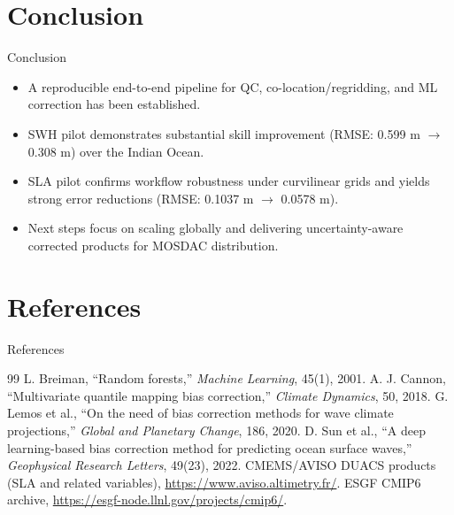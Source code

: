 \documentclass[aspectratio=169,11pt]{beamer}
\begin{document}
\section{Conclusion}

\begin{frame}{Conclusion}
  \begin{itemize}
    \item A reproducible end-to-end pipeline for QC, co-location/regridding, and ML correction has been established.
    \item SWH pilot demonstrates substantial skill improvement (RMSE: 0.599 m $\rightarrow$ 0.308 m) over the Indian Ocean.
    \item SLA pilot confirms workflow robustness under curvilinear grids and yields strong error reductions (RMSE: 0.1037 m $\rightarrow$ 0.0578 m).
    \item Next steps focus on scaling globally and delivering uncertainty-aware corrected products for MOSDAC distribution.
  \end{itemize}
\end{frame}

\section{References}

\begin{frame}[allowframebreaks]{References}
  \footnotesize
  \begin{thebibliography}{99}
     L. Breiman, ``Random forests,'' \emph{Machine Learning}, 45(1), 2001.
     A. J. Cannon, ``Multivariate quantile mapping bias correction,'' \emph{Climate Dynamics}, 50, 2018.
     G. Lemos et al., ``On the need of bias correction methods for wave climate projections,'' \emph{Global and Planetary Change}, 186, 2020.
     D. Sun et al., ``A deep learning-based bias correction method for predicting ocean surface waves,'' \emph{Geophysical Research Letters}, 49(23), 2022.
     CMEMS/AVISO DUACS products (SLA and related variables), \url{https://www.aviso.altimetry.fr/}.
     ESGF CMIP6 archive, \url{https://esgf-node.llnl.gov/projects/cmip6/}.
  \end{thebibliography}
\end{frame}
\end{document}

